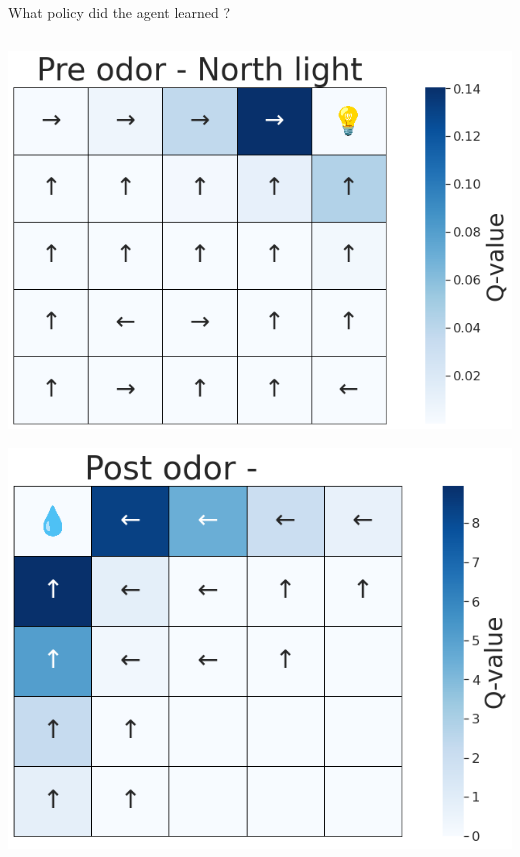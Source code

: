 \documentclass[bigger]{beamer}
\begin{document}
\begin{frame}[label={sec:orgf1093f7}]{What policy did the agent learned ?}
\addtocounter{framenumber}{-1}
\begin{columns}
\begin{column}[t]{0.5\columnwidth}
\begin{center}
\includegraphics[height=0.4\textheight]{img/policy-allo-north-light.png}
\end{center}
\begin{center}
\includegraphics[height=0.4\textheight]{img/policy-allo-odor-A.png}
\end{center}
\end{column}

\end{columns}
\end{frame}
\end{document}
